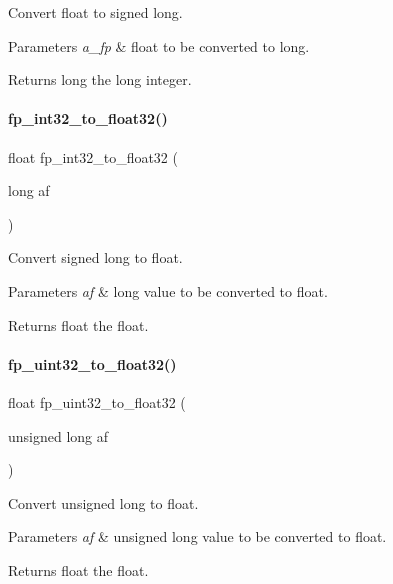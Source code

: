 Convert float to signed long. 


\begin{DoxyParams}{Parameters}
{\em a\+\_\+fp} & float to be converted to long. \\
\hline
\end{DoxyParams}
\begin{DoxyReturn}{Returns}
long the long integer. 
\end{DoxyReturn}
\mbox{\label{a00023_a13d2d336c17fa7ca9867415d017039f9}} 
\paragraph{\texorpdfstring{fp\+\_\+int32\+\_\+to\+\_\+float32()}{fp\_int32\_to\_float32()}}
{\footnotesize\ttfamily float fp\+\_\+int32\+\_\+to\+\_\+float32 (\begin{DoxyParamCaption}\item[{long}]{af }\end{DoxyParamCaption})}



Convert signed long to float. 


\begin{DoxyParams}{Parameters}
{\em af} & long value to be converted to float. \\
\hline
\end{DoxyParams}
\begin{DoxyReturn}{Returns}
float the float. 
\end{DoxyReturn}
\mbox{\label{a00023_a096ed4a261247431549a71225761fffc}} 
\paragraph{\texorpdfstring{fp\+\_\+uint32\+\_\+to\+\_\+float32()}{fp\_uint32\_to\_float32()}}
{\footnotesize\ttfamily float fp\+\_\+uint32\+\_\+to\+\_\+float32 (\begin{DoxyParamCaption}\item[{unsigned long}]{af }\end{DoxyParamCaption})}



Convert unsigned long to float. 


\begin{DoxyParams}{Parameters}
{\em af} & unsigned long value to be converted to float. \\
\hline
\end{DoxyParams}
\begin{DoxyReturn}{Returns}
float the float. 
\end{DoxyReturn}
